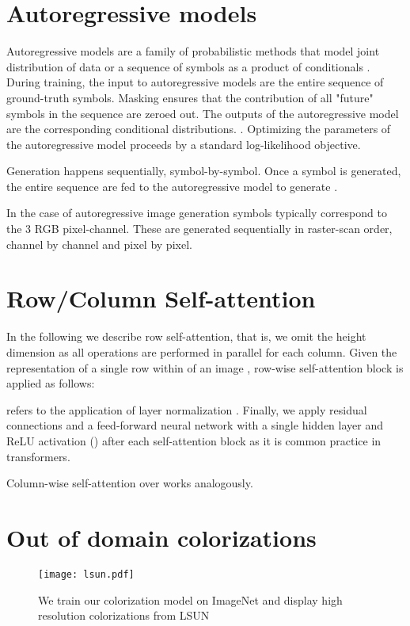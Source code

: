 \documentclass{article} \usepackage{iclr2021_conference,times}
\begin{document}
\section{Autoregressive models} \label{sec:autoregressive models}
Autoregressive models are a family of probabilistic methods that model joint distribution of data  or a sequence of symbols  as a product of conditionals . During training, the input to autoregressive models are the entire sequence of ground-truth symbols. Masking ensures that the contribution of all "future" symbols in the sequence are zeroed out. The outputs of the autoregressive model are the corresponding conditional distributions. . Optimizing the parameters of the autoregressive model proceeds by a standard log-likelihood objective.

Generation happens sequentially, symbol-by-symbol. Once a symbol  is generated, the entire sequence  are fed to the autoregressive model to generate .

In the case of autoregressive image generation symbols typically correspond to the 3 RGB pixel-channel. These are generated sequentially in raster-scan order, channel by channel and pixel by pixel.


\section{Row/Column Self-attention}\label{sec:row_col_self_attention}

In the following we describe row self-attention, that is, we omit the height dimension as all operations are performed in parallel for each column. Given the representation of a single row within of an image , row-wise self-attention block is applied as follows:

 refers to the application of layer normalization \citep{ba2016layer}. Finally, we apply residual connections and a feed-forward neural network with a single hidden layer and ReLU activation () after each self-attention block as it is common practice in transformers.


Column-wise self-attention over  works analogously.



\section{Out of domain colorizations}

\begin{figure*}
\centering
\texttt{[image: lsun.pdf]}
\caption{We train our colorization model on ImageNet and display high resolution colorizations from LSUN}
\label{fig:lsun}
\end{figure*}
\end{document}
